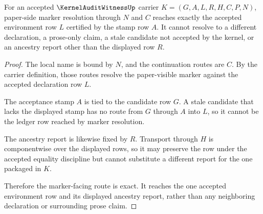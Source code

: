 \begin{theorem}
\label{thm:kernel-audit-witness-ledger-exactness}
For an accepted $\KernelAuditWitnessUp$ carrier $K=(G,A,L,R,H,C,P,N)$, paper-side marker resolution through $N$ and $C$ reaches exactly the accepted environment row $L$ certified by the stamp row $A$. It cannot resolve to a different declaration, a prose-only claim, a stale candidate not accepted by the kernel, or an ancestry report other than the displayed row $R$.
\end{theorem}
\begin{proof}
The local name is bound by $N$, and the continuation routes are $C$. By the carrier definition, those routes resolve the paper-visible marker against the accepted declaration row $L$.

The acceptance stamp $A$ is tied to the candidate row $G$. A stale candidate that lacks the displayed stamp has no route from $G$ through $A$ into $L$, so it cannot be the ledger row reached by marker resolution.

The ancestry report is likewise fixed by $R$. Transport through $H$ is componentwise over the displayed rows, so it may preserve the row under the accepted equality discipline but cannot substitute a different report for the one packaged in $K$.

Therefore the marker-facing route is exact. It reaches the one accepted environment row and its displayed ancestry report, rather than any neighboring declaration or surrounding prose claim.
\end{proof}

